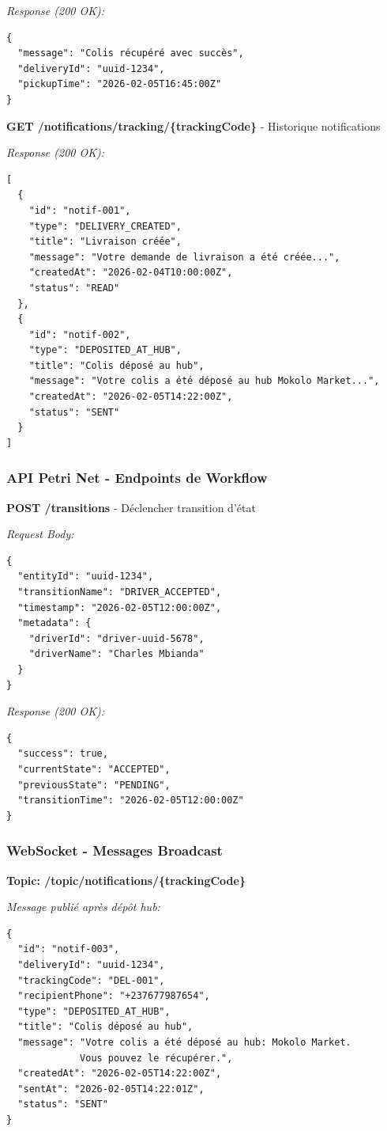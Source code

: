 \textit{Response (200 OK):}
\begin{verbatim}
{
  "message": "Colis récupéré avec succès",
  "deliveryId": "uuid-1234",
  "pickupTime": "2026-02-05T16:45:00Z"
}
\end{verbatim}

\textbf{GET /notifications/tracking/\{trackingCode\}} - Historique notifications

\textit{Response (200 OK):}
\begin{verbatim}
[
  {
    "id": "notif-001",
    "type": "DELIVERY_CREATED",
    "title": "Livraison créée",
    "message": "Votre demande de livraison a été créée...",
    "createdAt": "2026-02-04T10:00:00Z",
    "status": "READ"
  },
  {
    "id": "notif-002",
    "type": "DEPOSITED_AT_HUB",
    "title": "Colis déposé au hub",
    "message": "Votre colis a été déposé au hub Mokolo Market...",
    "createdAt": "2026-02-05T14:22:00Z",
    "status": "SENT"
  }
]
\end{verbatim}

\subsubsection{API Petri Net - Endpoints de Workflow}

\textbf{POST /transitions} - Déclencher transition d'état

\textit{Request Body:}
\begin{verbatim}
{
  "entityId": "uuid-1234",
  "transitionName": "DRIVER_ACCEPTED",
  "timestamp": "2026-02-05T12:00:00Z",
  "metadata": {
    "driverId": "driver-uuid-5678",
    "driverName": "Charles Mbianda"
  }
}
\end{verbatim}

\textit{Response (200 OK):}
\begin{verbatim}
{
  "success": true,
  "currentState": "ACCEPTED",
  "previousState": "PENDING",
  "transitionTime": "2026-02-05T12:00:00Z"
}
\end{verbatim}

\subsubsection{WebSocket - Messages Broadcast}

\textbf{Topic: /topic/notifications/\{trackingCode\}}

\textit{Message publié après dépôt hub:}
\begin{verbatim}
{
  "id": "notif-003",
  "deliveryId": "uuid-1234",
  "trackingCode": "DEL-001",
  "recipientPhone": "+237677987654",
  "type": "DEPOSITED_AT_HUB",
  "title": "Colis déposé au hub",
  "message": "Votre colis a été déposé au hub: Mokolo Market. 
             Vous pouvez le récupérer.",
  "createdAt": "2026-02-05T14:22:00Z",
  "sentAt": "2026-02-05T14:22:01Z",
  "status": "SENT"
}
\end{verbatim}

